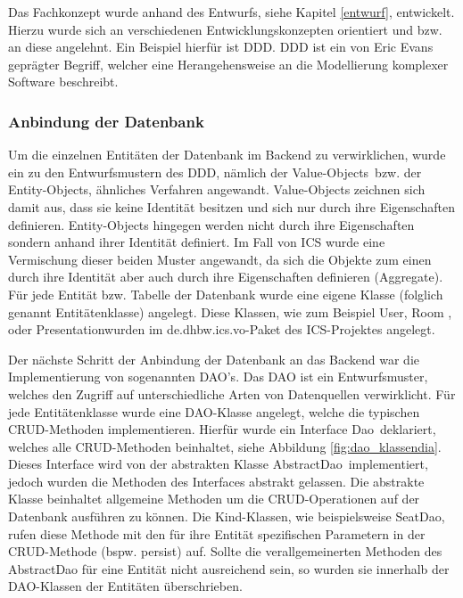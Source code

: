 	Das Fachkonzept wurde anhand des Entwurfs, siehe Kapitel \ref{entwurf}, entwickelt. Hierzu wurde sich an verschiedenen Entwicklungskonzepten orientiert und bzw. an diese angelehnt. Ein Beispiel hierfür ist \ac{DDD}. \ac{DDD} ist ein von Eric Evans geprägter Begriff, welcher eine Herangehensweise an die Modellierung komplexer Software beschreibt. \autocite{WikimediaFoundationInc.2019a}
	
	\subsubsection{Anbindung der Datenbank}
	
	Um die einzelnen Entitäten der Datenbank im Backend zu verwirklichen, wurde ein zu den Entwurfsmustern des \ac{DDD}, nämlich der \glqq Value-Objects\grqq \, bzw. der Entity-Objects, ähnliches Verfahren angewandt. Value-Objects zeichnen sich damit aus, dass sie keine Identität besitzen und sich nur durch ihre Eigenschaften definieren. Entity-Objects hingegen werden nicht durch ihre Eigenschaften sondern anhand ihrer Identität definiert. \autocite{WikimediaFoundationInc.2019a} Im Fall von \ac{ICS} wurde eine Vermischung dieser beiden Muster angewandt, da sich die Objekte zum einen durch ihre Identität aber auch durch ihre Eigenschaften definieren (Aggregate). Für jede Entität bzw. Tabelle der Datenbank wurde eine eigene Klasse (folglich genannt Entitätenklasse) angelegt. Diese Klassen, wie zum Beispiel \glqq User\grqq , \glqq Room \grqq , oder \glqq Presentation\grqq wurden im \glqq de.dhbw.ics.vo\grqq-Paket des \ac{ICS}-Projektes angelegt.
	
	Der nächste Schritt der Anbindung der Datenbank an das Backend war die Implementierung von sogenannten \ac{DAO}'s. Das \ac{DAO} ist ein Entwurfsmuster, welches den Zugriff auf unterschiedliche Arten von Datenquellen verwirklicht. \autocite{WikimediaFoundationInc.2019b} Für jede Entitätenklasse wurde eine \ac{DAO}-Klasse angelegt, welche die typischen \ac{CRUD}-Methoden implementieren. Hierfür wurde ein Interface \glqq Dao\grqq \, deklariert, welches alle \ac{CRUD}-Methoden beinhaltet, siehe Abbildung \ref{fig:dao_klassendia}. Dieses Interface wird von der abstrakten Klasse \glqq AbstractDao\grqq \, implementiert, jedoch wurden die Methoden des Interfaces abstrakt gelassen. Die abstrakte Klasse beinhaltet allgemeine Methoden um die \ac{CRUD}-Operationen auf der Datenbank ausführen zu können. Die Kind-Klassen, wie beispielsweise \glqq SeatDao\grqq, rufen diese Methode mit den für ihre Entität spezifischen Parametern in der \ac{CRUD}-Methode (bspw. \glqq persist\grqq) auf. Sollte die verallgemeinerten Methoden des AbstractDao für eine Entität nicht ausreichend sein, so wurden sie innerhalb der DAO-Klassen der Entitäten überschrieben.
	
